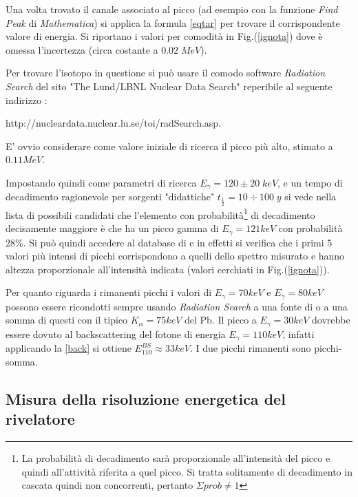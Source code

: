 \documentclass[12pt,a4paper,openright,twoside]{article}
\numberwithin{equation}{section} %
\begin{document}
Una volta trovato il canale associato al picco (ad esempio con la funzione \textit{Find Peak} di \textit{Mathematica}) si applica la formula \ref{eqtar} per trovare il corrispondente valore di energia. Si riportano i valori per comodità in Fig.(\ref{ignota}) dove è omessa l'incertezza (circa costante a $0.02 \; MeV$).

Per trovare l'isotopo in questione si può usare il comodo software \textit{Radiation Search} del sito "The Lund/LBNL Nuclear Data Search" reperibile al seguente indirizzo : 

http://nucleardata.nuclear.lu.se/toi/radSearch.asp. 

E' ovvio considerare come valore iniziale di ricerca il picco più alto, stimato a $0.11 MeV$.

Impostando quindi come parametri di ricerca $E_{\gamma}= 120 \pm 20 \; keV$, e un tempo di decadimento ragionevole per sorgenti "didattiche" $t_{\frac{1}{2}}=10 \div 100 \; y$ si vede nella lista di possibili candidati che l'elemento con probabilità\footnote{La probabilità di decadimento sarà proporzionale all'intensità del picco e quindi all'attività riferita a quel picco. Si tratta solitamente di decadimento in cascata quindi non concorrenti, pertanto $\Sigma prob \neq 1$ } di decadimento decisamente maggiore è \textbf{} che ha un picco gamma di $E_{\gamma}=121 keV$ con probabilità $28 \%$.
Si può quindi accedere al database di  e in effetti si verifica che i primi 5 valori più intensi di picchi corrispondono a quelli dello spettro misurato e hanno altezza proporzionale all'intensità indicata (valori cerchiati in Fig.(\ref{ignota})).

Per quanto riguarda i rimanenti picchi i valori di $E_{\gamma}=70 keV$ e $E_{\gamma}=80 keV$ possono essere ricondotti sempre usando \textit{Radiation Search} a una fonte di  o a una somma di questi con il tipico $K_{\alpha}=75keV$ del Pb.
Il picco a $E_{\gamma}=30 keV$ dovrebbe essere dovuto al backscattering del fotone di energia $E_{\gamma}=110 keV$, infatti applicando la \ref{back} si ottiene $E_{110} ^{BS} \approx 33 keV$.
I due picchi rimanenti sono picchi-somma.








\subsection{Misura della risoluzione energetica del rivelatore}
\end{document}
